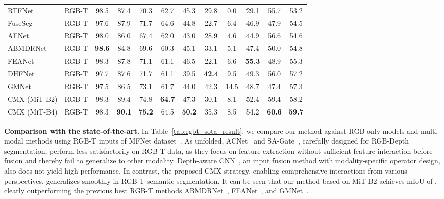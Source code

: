 \documentclass[journal]{IEEEtran}
\begin{document}
\begin{table*}[!t]
\begin{center}
\begin{tabular}{ l | c | c c c c c c c c c | c }
    RTFNet~\cite{sun2019rtfnet} & RGB-T & 98.5 & 87.4 & 70.3 & 62.7 & 45.3 & 29.8 & 0.0 & 29.1 & 55.7 & 53.2 \\
    FuseSeg~\cite{sun2020fuseseg} & RGB-T & 97.6 & 87.9 & 71.7 & 64.6 & 44.8 & 22.7 & 6.4 & 46.9 & 47.9 & 54.5 \\
    AFNet~\cite{xu2021attention_fusion} & RGB-T & 98.0 & 86.0 & 67.4 & 62.0 & 43.0 & 28.9 & 4.6 & 44.9 & 56.6 & 54.6\\
    ABMDRNet~\cite{zhang2021abmdrnet} & RGB-T & \textbf{98.6} & 84.8 & 69.6 & 60.3 & 45.1 & 33.1 & 5.1 & 47.4 & 50.0 & 54.8\\
    FEANet~\cite{deng2021feanet} & RGB-T & 98.3 & 87.8 & 71.1 & 61.1 & 46.5 & 22.1 & 6.6 & \textbf{55.3} & 48.9 & 55.3\\
    DHFNet~\cite{cai2023dhfnet} & RGB-T & 97.7 & 87.6 & 71.7 & 61.1 & 39.5 & \textbf{42.4} &  9.5 & 49.3 & 56.0 & 57.2\\
    GMNet~\cite{zhou2021gmnet} & RGB-T & 97.5 & 86.5 & 73.1 & 61.7 & 44.0 & 42.3 & 14.5 & 48.7 & 47.4 & 57.3\\
    \midrule
    \rowcolor{gray!15} CMX (MiT-B2) & RGB-T & 98.3 & 89.4 & 74.8 & \textbf{64.7} & 47.3 & 30.1 & 8.1 & 52.4 & 59.4 & 58.2\\
   \rowcolor{gray!15} CMX (MiT-B4) & RGB-T & 98.3 & \textbf{90.1} & \textbf{75.2} & 64.5 & \textbf{50.2} & {35.3} & 8.5 & 54.2 & \textbf{60.6} & \textbf{59.7} \\
    \bottomrule[1pt]
\end{tabular}     \end{center}
\end{table*}
\noindent\textbf{Comparison with the state-of-the-art.}
In Table~\ref{tab:rgbt_sota_result}, we compare our method against RGB-only models and multi-modal methods using RGB-T inputs of MFNet dataset~\cite{ha2017mfnet}.
As unfolded, ACNet~\cite{hu2019acnet} and SA-Gate~\cite{chen2020sa_gate}, carefully designed for RGB-Depth segmentation, perform less satisfactorily on RGB-T data, as they focus on feature extraction without sufficient feature interaction before fusion and thereby fail to generalize to other modality. Depth-aware CNN~\cite{wang2018depth_aware}, an input fusion method with modality-specific operator design, also does not yield high performance.
In contrast, the proposed CMX strategy, enabling comprehensive interactions from various perspectives, generalizes smoothly in RGB-T semantic segmentation.
It can be seen that our method based on MiT-B2 achieves mIoU of , clearly outperforming the previous best RGB-T methods ABMDRNet~\cite{zhang2021abmdrnet}, FEANet~\cite{deng2021feanet}, and GMNet~\cite{zhou2021gmnet}.
\end{document}
